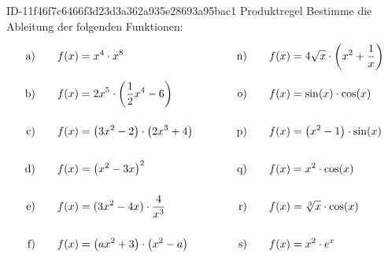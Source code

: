 \begin{exercise}
      {ID-11f46f7c6466f3d23d3a362a935e28693a95bac1}
      {Produktregel}
  \ifproblem\problem
    Bestimme die Ableitung der folgenden Funktionen:
    \begingroup
      \newcommand{\vstrut}{\rule[-3ex]{0pt}{7ex}}%
      \newcommand{\xca}{f(x)&=x^{4}\cdot x^{8}}%
      \newcommand{\xcb}{f(x)&=2x^{5}\cdot\left(\frac{1}{2}x^{4}-6\right)}%
      \newcommand{\xcc}{f(x)&=\left(3x^{2}-2\right)\cdot\left(2x^{3}+4\right)}%
      \newcommand{\xcd}{f(x)&=\left(x^{2}-3x\right)^{2}}%
      \newcommand{\xce}{f(x)&=(3x^{2}-4x)\cdot\frac{4}{x^{3}}}%
      \newcommand{\xcf}{f(x)&=\left(ax^{2}+3\right)\cdot\left(x^{2}-a\right)}%
      \newcommand{\xcg}{f(x)&=(x-t)\cdot\left(x^{2}+t^{2}\right)}%
      \newcommand{\xch}{f(t)&=\left(t^{2}+a^{2}\right)\cdot\left(at^{3}-a\right)}%
      \newcommand{\xci}{f(x)&=\left(7x-1\right)^{4}\cdot x^{-2}}%
      \newcommand{\xcj}{f(x)&=\left(x-1\right)\cdot\left(x^{2}+x+7\right)}%
      \newcommand{\xck}{f(x)&=(3x^{2}+x)\cdot(13x-9x^{2})}%
      \newcommand{\xcl}{f(x)&=\frac{1}{x}\cdot\left(x^{2}-4\right)}%
      \newcommand{\xcm}{f(x)&=x^{2}\cdot\sqrt{x}}%
      \newcommand{\xcn}{f(x)&=4\sqrt{x}\cdot\left(x^{2}+\frac{1}{x}\right)}%
      \newcommand{\xco}{f(x)&=\sin(x)\cdot\cos(x)}%
      \newcommand{\xcp}{f(x)&=\left(x^{2}-1\right)\cdot\sin(x)}%
      \newcommand{\xcq}{f(x)&=x^{2}\cdot\cos(x)}%
      \newcommand{\xcr}{f(x)&=\sqrt[3]{x}\cdot\cos(x)}%
      \newcommand{\xcs}{f(x)&=x^{2}\cdot e^{x}}%
      \newcommand{\xct}{f(x)&=(2x+4)\cdot e^{-2x}}%
      \newcommand{\xcu}{f(x)&=3axe^{x}}%
      \newcommand{\xcv}{f(x)&=e^{x}\cdot\sin(x)}%
      \newcommand{\xcw}{f(x)&=\left(x^{3}+e^{x}+1\right)\cdot\cos(x)}%
      \newcommand{\xcx}{f(x)&=x^{3}\cdot3^{x}}%
      \newcommand{\xcy}{f(x)&=x\cdot(\ln(x)-1)}%
      \newcommand{\xcz}{f(x)&=-5x^{2}\cdot\ln(x)}%
      \allowdisplaybreaks
      \begin{alignat*}{5}
        \text{a)\vstrut}&\quad & \xca & \quad&\quad & \text{n)\vstrut}&\quad & \xcn \\
        \text{b)\vstrut}&\quad & \xcb & \quad&\quad & \text{o)\vstrut}&\quad & \xco \\
        \text{c)\vstrut}&\quad & \xcc & \quad&\quad & \text{p)\vstrut}&\quad & \xcp \\
        \text{d)\vstrut}&\quad & \xcd & \quad&\quad & \text{q)\vstrut}&\quad & \xcq \\
        \text{e)\vstrut}&\quad & \xce & \quad&\quad & \text{r)\vstrut}&\quad & \xcr \\
        \text{f)\vstrut}&\quad & \xcf & \quad&\quad & \text{s)\vstrut}&\quad & \xcs \\

\end{alignat*}
\end{exercise}
